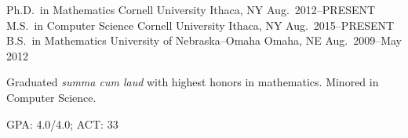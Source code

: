 \begin{cventries}
  \cventry
    {Ph.D.~in Mathematics}
    {Cornell University}
    {Ithaca, NY}
    {Aug.~2012--PRESENT}{}
  \cventry
    {M.S.~in Computer Science}
    {Cornell University}
    {Ithaca, NY}
    {Aug.~2015--PRESENT}
    {}
  \cventry
    {B.S.~in Mathematics}
    {University of Nebraska--Omaha}
    {Omaha, NE}
    {Aug.~2009--May 2012}
    {
      \begin{cvitems}
        \item {Graduated \emph{summa cum laud} with highest honors in mathematics. Minored in Computer Science.}
        \item{GPA: 4.0/4.0; ACT: 33}
      \end{cvitems}
    }
\end{cventries}
